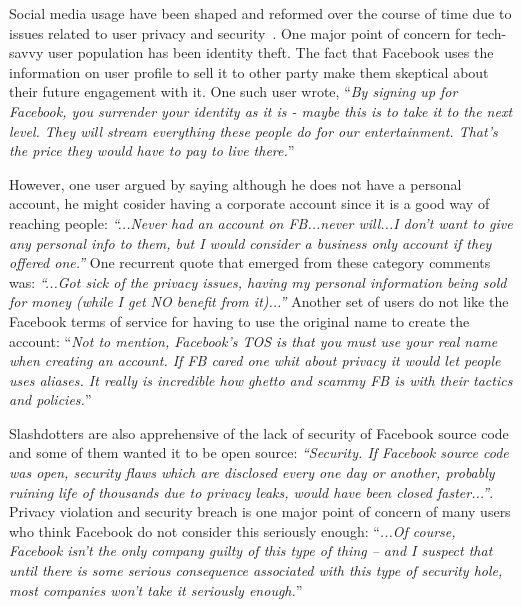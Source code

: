      Social media usage have been shaped and reformed over the course of time due to issues related to user privacy and security~\cite{vitak2015balancing}. One major point of concern for tech-savvy user population has been identity theft. The fact that Facebook uses the information on user profile to sell it to other party make them skeptical about their future engagement with it. One such user wrote,
     ``\textit{By signing up for Facebook, you surrender your identity as it is - maybe this is to take it to the next level. They will stream everything these people do for our entertainment. That's the price they would have to pay to live there.}''
    
    However, one user argued by saying although he does not have a personal account, he might cosider having a corporate account since it is a good way of reaching people: \textit{``...Never had an account on FB...never will...I don't want to give any personal info to them, but I would consider a business only account if they offered one.''} One recurrent quote that emerged from these category comments was: \textit{``...Got sick of the privacy issues, having my personal information being sold for money (while I get NO benefit from it)...''} Another set of users do not like the Facebook terms of service for having to use the original name to create the account: ``\textit{Not to mention, Facebook's TOS is that you must use your real name when creating an account. If FB cared one whit about privacy it would let people uses aliases. It really is incredible how ghetto and scammy FB is with their tactics and policies.}'' 
    
    Slashdotters are also apprehensive of the lack of security of Facebook source code and some of them wanted it to be open source: \textit{``Security. If Facebook source code was open, security flaws which are disclosed every one day or another, probably ruining life of thousands due to privacy leaks, would have been closed faster...''}. Privacy violation and security breach is one major point of concern of many users who think Facebook do not consider this seriously enough: ``\textit{...Of course, Facebook isn't the only company guilty of this type of thing -- and I suspect that until there is some serious consequence associated with this type of security hole, most companies won't take it seriously enough.}''
    
